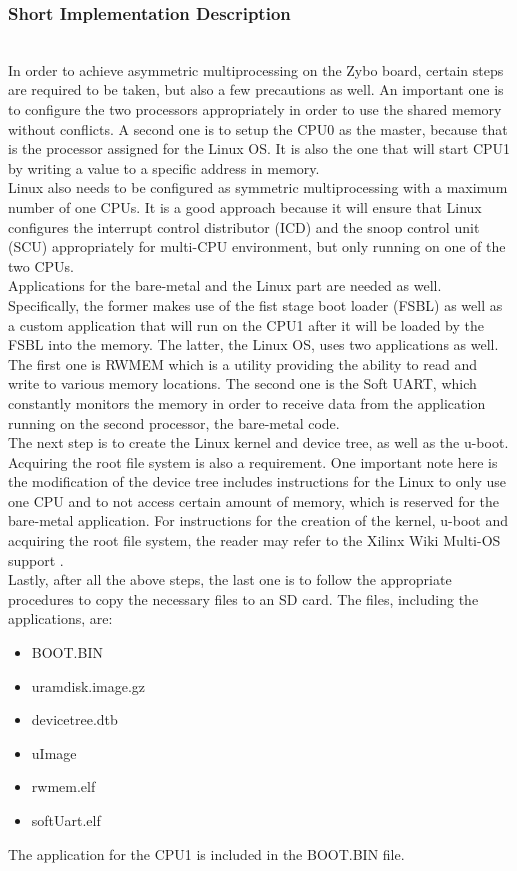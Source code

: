 \subsubsection*{Short Implementation Description}~\\
In order to achieve asymmetric multiprocessing on the Zybo board, certain steps are required to be taken, but also a few precautions as well.
An important one is to configure the two processors appropriately in order to use the shared memory without conflicts.
A second one is to setup the CPU0 as the master, because that is the processor assigned for the Linux OS.
It is also the one that will start CPU1 by writing a value to a specific address in memory.
\\
Linux also needs to be configured as symmetric multiprocessing with a maximum number of one CPUs.
It is a good approach because it will ensure that Linux configures the interrupt control distributor (ICD) and the snoop control unit (SCU) appropriately for multi-CPU environment, but only running on one of the two CPUs.
\\
Applications for the bare-metal and the Linux part are needed as well. Specifically, the former makes use of the fist stage boot loader (FSBL) as well as a custom application that will run on the CPU1 after it will be loaded by the FSBL into the memory.
The latter, the Linux OS, uses two applications as well.
The first one is RWMEM which is a utility providing the ability to read and write to various memory locations.
The second one is the Soft UART, which constantly monitors the memory in order to receive data from the application running on the second processor, the bare-metal code.
\\
The next step is to create the Linux kernel and device tree, as well as the u-boot.
Acquiring the root file system is also a requirement.
One important note here is the modification of the device tree includes instructions for the Linux to only use one CPU and to not access certain amount of memory, which is reserved for the bare-metal application.
For instructions for the creation of the kernel, u-boot and acquiring the root file system, the reader may refer to the Xilinx Wiki Multi-OS support \cite{Xilinx_wiki_amp}.\\

Lastly, after all the above steps, the last one is to follow the appropriate procedures to copy the necessary files to an SD card. The files, including the applications, are:
\begin{itemize}
\item BOOT.BIN
\item uramdisk.image.gz
\item devicetree.dtb
\item uImage
\item rwmem.elf
\item softUart.elf
\end{itemize}

The application for the CPU1 is included in the BOOT.BIN file.